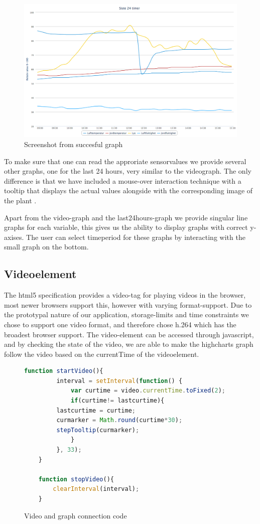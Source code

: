 \begin{figure}
\centering
\includegraphics[width=1\textwidth]{img/interface/goodgraph.png}
\caption{Screenshot from succesful graph}
\label{fig:goodgraph}
\end{figure}

To make sure that one can read the approriate sensorvalues we provide several other graphs, one for the last 24 hours, very similar to the videograph. The only difference is that we have included a mouse-over interaction technique with a tooltip that displays the actual values alongside with the corresponding image of the plant \citep[p.254]{kluge2010simulation}.

Apart from the video-graph and the last24hours-graph we provide singular line graphs for each variable, this gives us the ability to display graphs with correct y-axises. The user can select timeperiod for these graphs by interacting with the small graph on the bottom. 

\subsection{Videoelement}
The html5 specification provides a video-tag for playing videos in the browser, most newer browsers support this, however with varying format-support. Due to the prototypal nature of our application, storage-limits and time constraints we chose to support one video format, and therefore chose h.264 which has the broadest browser support. The video-element can be accessed through javascript, and by checking the state of the video, we are able to make the highcharts graph follow the video based on the currentTime of the videoelement.

\begin{figure}
	\begin{lstlisting}[language=javascript]
	function startVideo(){
	     interval = setInterval(function() {
	         var curtime = video.currentTime.toFixed(2);
	         if(curtime!= lastcurtime){
		 lastcurtime = curtime;
		 curmarker = Math.round(curtime*30);
		 stepTooltip(curmarker);
	         }
	     }, 33);
	}

	function stopVideo(){
		clearInterval(interval);
	}
	\end{lstlisting}
	\caption{Video and graph connection code}
	\label{fig:videocode}
\end{figure}

